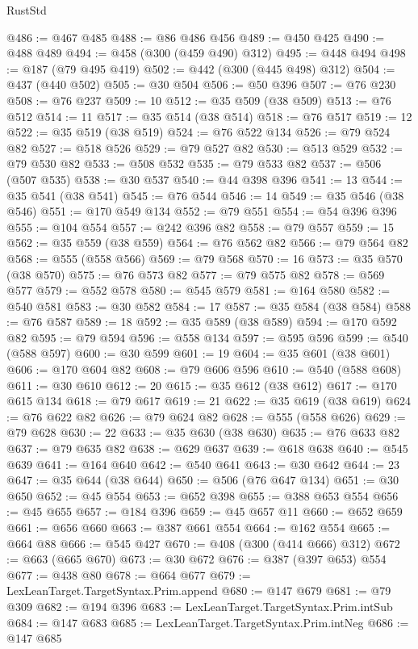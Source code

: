 \begin{lexlean}{RustStd}
\begin{coremodule}
{\begin{coremodule}
{{{{{{{{{{{{{{{{{{{{{{{{{{{{{{{@486 := @467 @485
@488 := @86 @486 @456
@489 := @450 @425
@490 := @488 @489
@494 := @458 (@300 (@459 @490) @312)
@495 := @448 @494
@498 := @187 (@79 @495 @419)
@502 := @442 (@300 (@445 @498) @312)
@504 := @437 (@440 @502)
@505 := @30 @504
@506 := @50 @396
@507 := @76 @230
@508 := @76 @237
@509 := 10
@512 := @35 @509 (@38 @509)
@513 := @76 @512
@514 := 11
@517 := @35 @514 (@38 @514)
@518 := @76 @517
@519 := 12
@522 := @35 @519 (@38 @519)
@524 := @76 @522 @134
@526 := @79 @524 @82
@527 := @518 @526
@529 := @79 @527 @82
@530 := @513 @529
@532 := @79 @530 @82
@533 := @508 @532
@535 := @79 @533 @82
@537 := @506 (@507 @535)
@538 := @30 @537
@540 := @44 @398 @396
@541 := 13
@544 := @35 @541 (@38 @541)
@545 := @76 @544
@546 := 14
@549 := @35 @546 (@38 @546)
@551 := @170 @549 @134
@552 := @79 @551
@554 := @54 @396 @396
@555 := @104 @554
@557 := @242 @396 @82
@558 := @79 @557
@559 := 15
@562 := @35 @559 (@38 @559)
@564 := @76 @562 @82
@566 := @79 @564 @82
@568 := @555 (@558 @566)
@569 := @79 @568
@570 := 16
@573 := @35 @570 (@38 @570)
@575 := @76 @573 @82
@577 := @79 @575 @82
@578 := @569 @577
@579 := @552 @578
@580 := @545 @579
@581 := @164 @580
@582 := @540 @581
@583 := @30 @582
@584 := 17
@587 := @35 @584 (@38 @584)
@588 := @76 @587
@589 := 18
@592 := @35 @589 (@38 @589)
@594 := @170 @592 @82
@595 := @79 @594
@596 := @558 @134
@597 := @595 @596
@599 := @540 (@588 @597)
@600 := @30 @599
@601 := 19
@604 := @35 @601 (@38 @601)
@606 := @170 @604 @82
@608 := @79 @606 @596
@610 := @540 (@588 @608)
@611 := @30 @610
@612 := 20
@615 := @35 @612 (@38 @612)
@617 := @170 @615 @134
@618 := @79 @617
@619 := 21
@622 := @35 @619 (@38 @619)
@624 := @76 @622 @82
@626 := @79 @624 @82
@628 := @555 (@558 @626)
@629 := @79 @628
@630 := 22
@633 := @35 @630 (@38 @630)
@635 := @76 @633 @82
@637 := @79 @635 @82
@638 := @629 @637
@639 := @618 @638
@640 := @545 @639
@641 := @164 @640
@642 := @540 @641
@643 := @30 @642
@644 := 23
@647 := @35 @644 (@38 @644)
@650 := @506 (@76 @647 @134)
@651 := @30 @650
@652 := @45 @554
@653 := @652 @398
@655 := @388 @653 @554
@656 := @45 @655
@657 := @184 @396
@659 := @45 @657 @11
@660 := @652 @659
@661 := @656 @660
@663 := @387 @661 @554
@664 := @162 @554
@665 := @664 @88
@666 := @545 @427
@670 := @408 (@300 (@414 @666) @312)
@672 := @663 (@665 @670)
@673 := @30 @672
@676 := @387 (@397 @653) @554
@677 := @438 @80
@678 := @664 @677
@679 := LexLeanTarget.TargetSyntax.Prim.append
@680 := @147 @679
@681 := @79 @309
@682 := @194 @396
@683 := LexLeanTarget.TargetSyntax.Prim.intSub
@684 := @147 @683
@685 := LexLeanTarget.TargetSyntax.Prim.intNeg
@686 := @147 @685
}}}}}}}}}}}}}}}}}}}}}}}}}}}}}}}
\end{coremodule}}
\end{coremodule}
\end{lexlean}
